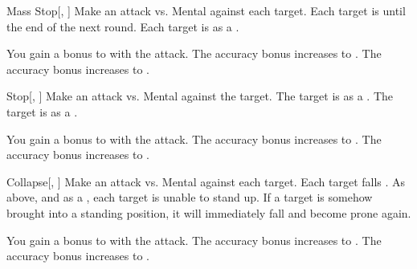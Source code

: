 \lowercase{\hypertarget{spell:Mass Stop}{}}\label{spell:Mass Stop}
\begin{freeability}[Rank 1]{\hypertarget{spell:Mass Stop}{Mass Stop}}[, ]
Make an attack vs. Mental against each target.
\hit Each target is  until the end of the next round.
\crit Each target is  as a .

\rankline
{} You gain a  bonus to  with the attack.
 The accuracy bonus increases to .
 The accuracy bonus increases to .

\end{freeability}
\vspace{0.25em}



\lowercase{\hypertarget{spell:Stop}{}}\label{spell:Stop}
\begin{freeability}[Rank 1]{\hypertarget{spell:Stop}{Stop}}[, ]
Make an attack vs. Mental against the target.
\hit The target is  as a .
\crit The target is  as a .

\rankline
{} You gain a  bonus to  with the attack.
 The accuracy bonus increases to .
 The accuracy bonus increases to .

\end{freeability}
\vspace{0.25em}



\lowercase{\hypertarget{spell:Collapse}{}}\label{spell:Collapse}
\begin{freeability}[Rank 2]{\hypertarget{spell:Collapse}{Collapse}}[, ]
Make an attack vs. Mental against each target.
\hit Each target falls .
\crit As above, and as a , each target is unable to stand up.
If a target is somehow brought into a standing position, it will immediately fall and become prone again.

\rankline
{} You gain a  bonus to  with the attack.
 The accuracy bonus increases to .
 The accuracy bonus increases to .

\end{freeability}
\vspace{0.25em}



